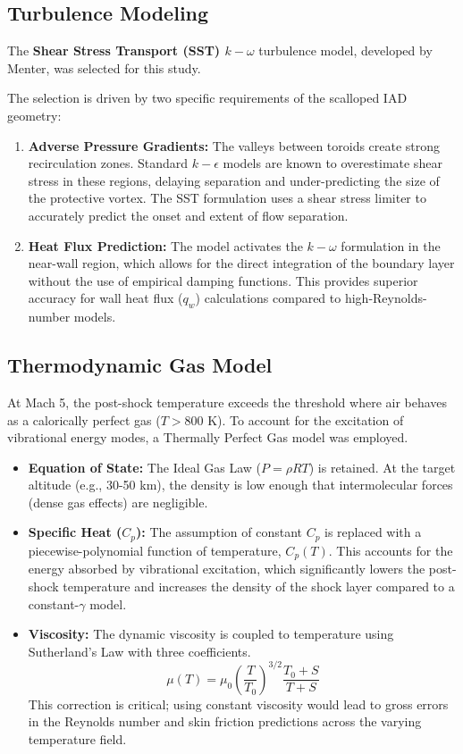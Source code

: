 \subsection{Turbulence Modeling}
The \textbf{Shear Stress Transport (SST) $k-\omega$} turbulence model, developed by Menter, was selected for this study.

The selection is driven by two specific requirements of the scalloped IAD geometry:
\begin{enumerate}
    \item \textbf{Adverse Pressure Gradients:} The valleys between toroids create strong recirculation zones. Standard $k-\epsilon$ models are known to overestimate shear stress in these regions, delaying separation and under-predicting the size of the protective vortex. The SST formulation uses a shear stress limiter to accurately predict the onset and extent of flow separation.
    \item \textbf{Heat Flux Prediction:} The model activates the $k-\omega$ formulation in the near-wall region, which allows for the direct integration of the boundary layer without the use of empirical damping functions. This provides superior accuracy for wall heat flux ($q_w$) calculations compared to high-Reynolds-number models.
\end{enumerate}

\subsection{Thermodynamic Gas Model}
At Mach 5, the post-shock temperature exceeds the threshold where air behaves as a calorically perfect gas ($T > 800$ K). To account for the excitation of vibrational energy modes, a Thermally Perfect Gas model was employed.

\begin{itemize}
    \item \textbf{Equation of State:} The Ideal Gas Law ($P = \rho RT$) is retained. At the target altitude (e.g., 30-50 km), the density is low enough that intermolecular forces (dense gas effects) are negligible.
    \item \textbf{Specific Heat ($C_p$):} The assumption of constant $C_p$ is replaced with a piecewise-polynomial function of temperature, $C_p(T)$. This accounts for the energy absorbed by vibrational excitation, which significantly lowers the post-shock temperature and increases the density of the shock layer compared to a constant-$\gamma$ model.
    \item \textbf{Viscosity:} The dynamic viscosity is coupled to temperature using Sutherland's Law with three coefficients.
    \begin{equation}
        \mu(T) = \mu_0 \left( \frac{T}{T_0} \right)^{3/2} \frac{T_0 + S}{T + S}
    \end{equation}
    This correction is critical; using constant viscosity would lead to gross errors in the Reynolds number and skin friction predictions across the varying temperature field.
\end{itemize}

